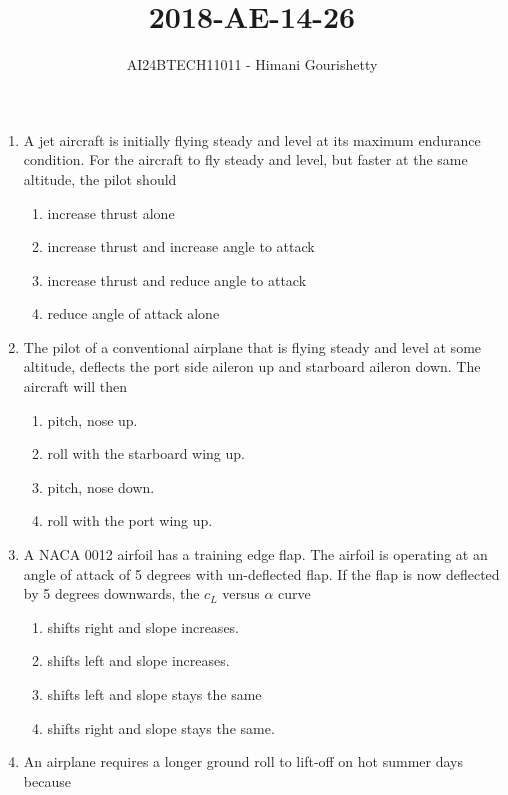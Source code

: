 \documentclass[journal,12pt,onecolumn]{IEEEtran}
\theoremstyle{remark}
\begin{document}

\vspace{3cm}

\title{2018-AE-14-26}
\author{AI24BTECH11011 - Himani Gourishetty}
\maketitle
\bigskip

\renewcommand{\thefigure}{\theenumi}
\renewcommand{\thetable}{\theenumi}
\begin{enumerate}
\item A jet aircraft is initially flying steady and level at its maximum endurance condition. For the aircraft to fly steady and level, but faster at the same altitude, the pilot should
\begin{enumerate}
    \item increase thrust alone
    \item increase thrust and increase angle to attack
    \item increase thrust and reduce angle to attack
    \item reduce angle of attack alone
\end{enumerate}
\item The pilot of a conventional airplane that is flying steady and level at some altitude, deflects the port side aileron up and starboard aileron down. The aircraft will then
\begin{enumerate}
    \item pitch, nose up.
    \item roll with the starboard wing up.
    \item pitch, nose down.
    \item roll with the port wing up.
\end{enumerate}
\item A NACA 0012 airfoil has a training edge flap. The airfoil is operating at an angle of attack of 5 degrees with un-deflected flap. If the flap is now deflected by 5 degrees downwards, the $c_L$ versus $\alpha$ curve
\begin{enumerate}
    \item shifts right and slope increases.
    \item shifts left and slope increases.
    \item shifts left and slope stays the same
    \item shifts right and slope stays the same.
\end{enumerate}
\item An airplane requires a longer ground roll to lift-off on hot summer days because

\end{enumerate}
\end{document}

